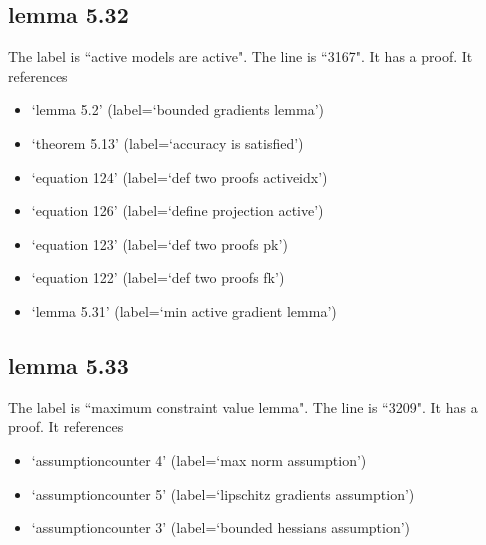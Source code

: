 \documentclass{article}
\begin{document}
\subsection{lemma 5.32}
The label is ``active models are active".
The line is ``3167".
It has a proof.
It references \begin{itemize}
\item `lemma 5.2' (label=`bounded gradients lemma')
\item `theorem 5.13' (label=`accuracy is satisfied')
\item `equation 124' (label=`def two proofs activeidx')
\item `equation 126' (label=`define projection active')
\item `equation 123' (label=`def two proofs pk')
\item `equation 122' (label=`def two proofs fk')
\item `lemma 5.31' (label=`min active gradient lemma')
\end{itemize}
\subsection{lemma 5.33}
The label is ``maximum constraint value lemma".
The line is ``3209".
It has a proof.
It references \begin{itemize}
\item `assumptioncounter 4' (label=`max norm assumption')
\item `assumptioncounter 5' (label=`lipschitz gradients assumption')
\item `assumptioncounter 3' (label=`bounded hessians assumption')
\end{itemize}
\end{document}
